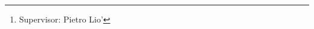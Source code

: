 \documentclass[a4paper,twoside,draft]{report}
\begin{document}
\author{Maxwell Conway \thanks{Supervisor: Pietro Lio'}}
\date{}
\begin{abstract}

\end{abstract}









\appendix
\end{document}
